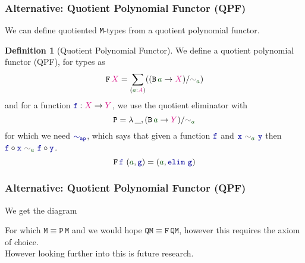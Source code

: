\documentclass[xelatex,mathserif,serif,notheorems]{beamer} %
\theoremstyle{plain} %
\theoremstyle{definition}
\newtheorem{defn}[thm]{Definition}%
\theoremstyle{remark}
\newcommand*{\term}[1]{\textcolor{green!30!black}{#1}} %
\newcommand*{\type}[1]{\textcolor{magenta!90!black}{#1}}
\newcommand*{\unit}{\type{\textbf{1}}}
\newcommand*{\relation}[1]{\textcolor{gray!75!black}{\ensuremath{\mathtt{#1}}}}
\newcommand*{\function}[1]{\textcolor{blue!60!black}{\ensuremath{\mathtt{#1}}}}
\newcommand*{\typeformer}[1]{\ensuremath{\mathtt{#1}}}
\newcommand*{\functor}[1]{\ensuremath{\mathbf{\mathtt{#1}}}}
\newcommand{\setlengths}{
  \setlength{\abovedisplayskip}{4pt}
  \setlength{\belowdisplayskip}{4pt}
  \setlength{\abovedisplayshortskip}{2pt}
  \setlength{\belowdisplayshortskip}{2pt}
}
\begin{document}
\begin{frame}
  \frametitle{Alternative: Quotient Polynomial Functor (QPF)}
  We can define quotiented \texttt{M}-types from a quotient polynomial functor.
  \begin{defn}[Quotient Polynomial Functor]\setlengths
    We define a quotient polynomial functor (QPF), for types as
    \begin{equation}
      \functor{F}\,\type{X} =  \sum_{(\term{a} : \type{A})} ((\typeformer{B}\,\term{a} \rightarrow \type{X}) / \relation{\sim}_{\term{a}})
    \end{equation}
    and for a function \(\function{f} : \type{X} \rightarrow \type{Y}\), we use the quotient eliminator with
    \begin{equation}
      \typeformer{P} = \lambda\,\_, (\typeformer{B}\,\term{a} \rightarrow \type{Y})/\relation{\sim}_{\term{a}}
    \end{equation}
    for which we need \(\function{\sim_{ap}}\), which says that given a function \(\function{f}\) and \(\function{x}~\relation{\sim}_{\term{a}}~\function{y}\) then \(\function{f} \circ \function{x}~\relation{\sim}_{\term{a}}~\function{f} \circ \function{y}\).
    \begin{equation}
      \functor{F}\,\function{f}~(\term{a} , \function{g}) = (\term{a} , \function{elim}~\function{g})
    \end{equation}
  \end{defn}
\end{frame}

\begin{frame}[fragile]
  \frametitle{Alternative: Quotient Polynomial Functor (QPF)}
  We get the diagram
  \begin{figure}
    \centering
  \end{figure}
  For which \(\typeformer{M} \equiv \functor{P}\,\typeformer{M}\) and we would hope \(\typeformer{QM} \equiv \functor{F}\,\typeformer{QM}\), however this requires the axiom of choice.
  \\[3mm]
  \pause
  However looking further into this is future research.
\end{frame}
\end{document}
